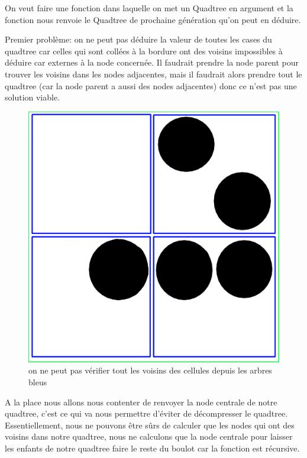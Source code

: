 On veut faire une fonction dans laquelle on met un Quadtree en argument et la fonction nous renvoie le Quadtree de prochaine génération qu'on peut en déduire.

Premier problème: on ne peut pas déduire la valeur de toutes les cases du quadtree car celles qui sont collées à la bordure ont des voisins impossibles à déduire car externes à la node concernée. Il faudrait prendre la node parent pour trouver les voisins dans les nodes adjacentes, mais il faudrait alors prendre tout le quadtree (car la node parent a aussi des nodes adjacentes) donc ce n'est pas une solution viable.

\begin{figure}[htp]
        \center
        \includegraphics[scale=0.7]{images/imgHashlife/GOLfig1.png}
        \caption{on ne peut pas vérifier tout les voisins des cellules depuis les arbres bleus }
\end{figure}

A la place nous allons nous contenter de renvoyer la node centrale de notre quadtree, c'est ce qui va nous permettre d'éviter de décompresser le quadtree. Essentiellement, nous ne pouvons être sûrs de calculer que les nodes qui ont des voisins dans notre quadtree, nous ne calculons que la node centrale pour laisser les enfants de notre quadtree faire le reste du boulot car la fonction est récursive.

